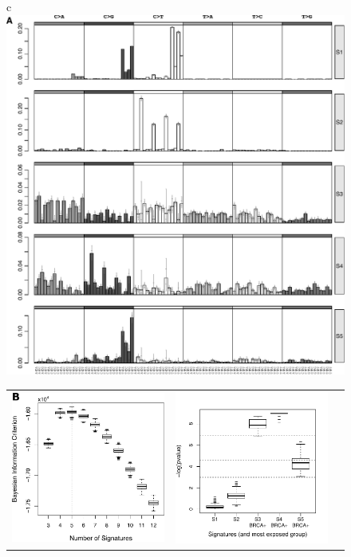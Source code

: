\documentclass{bioinfo}
\begin{document}
\begin{figure}
  \centering
  \begin{tabular}{c}
   \includegraphics[width=13cm]{figs/Signatures_5_com_Opp_bw}
  \\
   \begin{tabular}{ccc}
    \includegraphics[width=5.5cm]{figs/BICs_21bc_with_Opportunity_5_3to12}
   &
     \includegraphics[width=5.5cm]{figs/Diffexp_boxplot_21bc_com_Opp_b2}

\end{tabular}
\end{tabular}
\end{figure}
\end{document}
